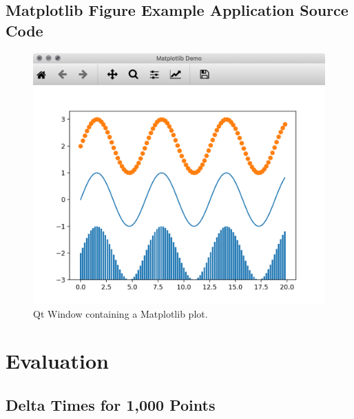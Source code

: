 
\subsection{Matplotlib Figure Example Application Source Code}

\begin{figure}[h]
    \centering
    \includegraphics[width=14cm]{resources/img/MatplotlibDemo}
    \caption{Qt Window containing a Matplotlib plot.}
    \label{a:fig:matplotlib:window}
\end{figure}

\clearpage





\section{Evaluation}
\label{sec:appendix:evaluation}


\subsection{Delta Times for 1,000 Points}

